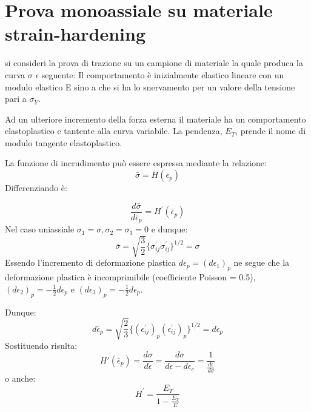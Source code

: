 \section{Prova monoassiale su materiale strain-hardening}
si consideri la prova di trazione su un campione di materiale la quale produca la curva $\sigma$  $\epsilon$ seguente:
Il comportamento è inizialmente elastico lineare con un modulo elastico E sino a che si ha lo snervamento per un valore della tensione pari a $\sigma_Y$. 

Ad un ulteriore incremento della forza esterna il materiale ha un comportamento elastoplastico e tantente alla curva variabile. La pendenza, $E_T$,  prende il nome di modulo tangente elastoplastico.

La funzione di incrudimento può essere espressa mediante la relazione:
\begin{equation}
	\bar{\sigma} = H(\epsilon_p)
\end{equation}
Differenziando è:

\begin{equation}
	\frac{d \bar{\sigma}} {d \bar{\epsilon}_p} = H^{'}(\bar{\epsilon}_p) 
\end{equation}
Nel caso uniassiale $\sigma_1 = \sigma, \sigma_2=\sigma_3=0$  e dunque:
\begin{equation}
	\bar{\sigma} = \sqrt{\frac{3}{2}} \{ \sigma_{ij}^{'} \sigma_{ij}^{'} \}^{1/2} = \sigma
\end{equation}
Essendo l'incremento di deformazione plastica $d\epsilon_p =(d\epsilon_1)_p$ ne segue che la deformazione plastica è incomprimibile (coefficiente Poisson = 0.5), $(d\epsilon_2)_p = -\frac{1}{2} d \epsilon_p$ e $(d\epsilon_3)_p = -\frac{1}{2} d \epsilon_p$. 

Dunque:
\begin{equation}
	d \bar{\epsilon}_p = \sqrt{\frac{2}{3}} \{ (\epsilon_{ij}^{'})_p (\epsilon_{ij}^{'})_p \}^{1/2} = d \epsilon_p
\end{equation}
Sostituendo risulta:
\begin{equation}
	H'(\bar{\epsilon}_p) = \frac{d \sigma}{d\epsilon} = \frac{d \sigma}{d \epsilon - d \epsilon_e} = \frac{1}{\frac{d \epsilon}{d \sigma}}
\end{equation}
o anche:
\begin{equation}
	H^{'} = \frac{E_T}{1- \frac{E_T}{E}}
\end{equation}

